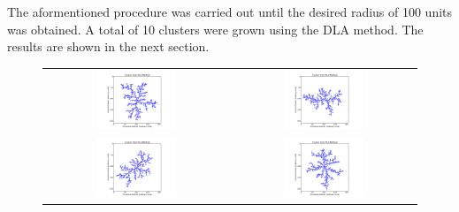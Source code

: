 \documentclass[a4paper,12pt]{article}
\begin{document}
\indent The aformentioned procedure was carried out until the desired radius of 100 units was obtained.  A total of 10 clusters were grown using the DLA method.  The
results are shown in the next section.

\begin{figure}[htb]
\centering
	\begin{tabular}{@{}cc@{}}
		\includegraphics[width = 0.45\textwidth]{pics/DLA_crystal_final_1.pdf} &
		\includegraphics[width = 0.45\textwidth]{pics/DLA_crystal_final_2.pdf} \\
		\includegraphics[width = 0.45\textwidth]{pics/DLA_crystal_final_3.pdf} &
		\includegraphics[width = 0.45\textwidth]{pics/DLA_crystal_final_4.pdf} \\

\end{tabular}
\end{figure}
\end{document}
